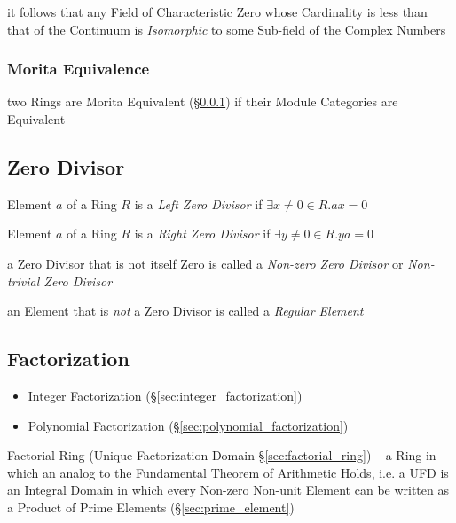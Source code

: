 it follows that any Field of Characteristic Zero whose Cardinality is less than
that of the Continuum is \emph{Isomorphic} to some Sub-field of the Complex
Numbers



\subsubsection{Morita Equivalence}\label{sec:morita_equivalence}

two Rings are Morita Equivalent (\S\ref{sec:morita_equivalence}) if their
Module Categories are Equivalent



\subsection{Zero Divisor}\label{sec:zero_divisor}

Element $a$ of a Ring $R$ is a \emph{Left Zero Divisor} if
$\exists x \neq 0 \in R. ax = 0$

Element $a$ of a Ring $R$ is a \emph{Right Zero Divisor} if
$\exists y \neq 0 \in R. ya = 0$

a Zero Divisor that is not itself Zero is called a \emph{Non-zero Zero Divisor}
or \emph{Non-trivial Zero Divisor}

an Element that is \emph{not} a Zero Divisor is called a \emph{Regular Element}



\subsection{Factorization}\label{sec:factorization}

\begin{itemize}
  \item Integer Factorization (\S\ref{sec:integer_factorization})
  \item Polynomial Factorization (\S\ref{sec:polynomial_factorization})
\end{itemize}

\fist Factorial Ring (Unique Factorization Domain \S\ref{sec:factorial_ring}) --
a Ring in which an analog to the Fundamental Theorem of Arithmetic Holds, i.e. a
UFD is an Integral Domain in which every Non-zero Non-unit Element can be
written as a Product of Prime Elements (\S\ref{sec:prime_element})



